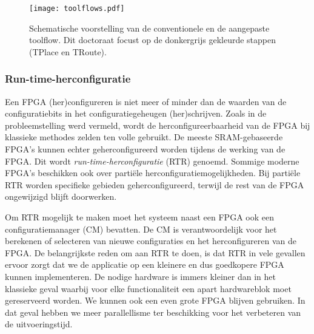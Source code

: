 \documentclass[a4paper,oneside,12pt]{article}
\begin{document}
\begin{figure}[ht]
\centering
\texttt{[image: toolflows.pdf]}
\caption{Schematische voorstelling van de conventionele en de aangepaste toolflow. Dit doctoraat focust op de donkergrijs gekleurde stappen (TPlace en TRoute).}
\label{toolflows}
\end{figure}

\subsubsection{Run-time-herconfiguratie}\label{rtr}
Een FPGA (her)configureren is niet meer of minder dan de waarden van de configuratiebits in het configuratiegeheugen (her)schrijven. Zoals in de probleemstelling werd vermeld, wordt de herconfigureerbaarheid van de FPGA bij klassieke methodes zelden ten volle gebruikt. %
De meeste SRAM-gebaseerde FPGA's kunnen echter geherconfigureerd worden tijdens de werking van de FPGA. Dit wordt {\em run-time-herconfiguratie} (RTR) genoemd. Sommige moderne FPGA's \cite{XilinxRTRFlow1,XilinxRTRFlow2} beschikken ook over parti\"ele herconfiguratiemogelijkheden. Bij parti\"ele RTR worden specifieke gebieden geherconfigureerd, terwijl de rest van de FPGA ongewijzigd blijft doorwerken. 

Om RTR mogelijk te maken moet het systeem naast een FPGA ook een configuratiemanager (CM) bevatten. De CM is verantwoordelijk voor het berekenen of selecteren van nieuwe configuraties en het herconfigureren van de FPGA. De belangrijkste reden om aan RTR te doen, is dat RTR in vele gevallen ervoor zorgt dat we de applicatie op een kleinere en dus goedkopere FPGA kunnen implementeren. De nodige hardware is immers kleiner dan in het klassieke geval waarbij voor elke functionaliteit een apart hardwareblok moet gereserveerd worden. We kunnen ook een even grote FPGA blijven gebruiken. In dat geval hebben we meer parallellisme ter beschikking voor het verbeteren van de uitvoeringstijd.
\end{document}
